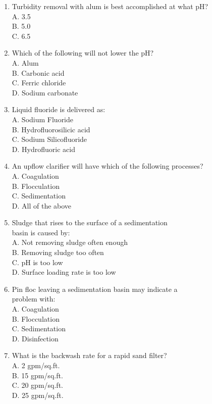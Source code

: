 \begin{enumerate}
\item Turbidity removal with alum is best accomplished at what pH?\\
A. 3.5\\
B. 5.0\\
C. 6.5\\

\item Which of the following will not lower the pH?\\
A. Alum\\
B. Carbonic acid\\
C. Ferric chloride\\
D. Sodium carbonate\\

\item  Liquid fluoride is delivered as:\\
A. Sodium Fluoride\\
B. Hydrofluorosilicic acid\\
C. Sodium Silicofluoride\\
D. Hydrofluoric acid\\


\item An upflow clarifier will have which of the following processes?\\
A. Coagulation\\
B. Flocculation\\
C. Sedimentation\\
D. All of the above\\

\item Sludge that rises to the surface of a sedimentation\\
basin is caused by:\\
A. Not removing sludge often enough\\
B. Removing sludge too often\\
C. pH is too low\\
D. Surface loading rate is too low\\

\item Pin floc leaving a sedimentation basin may indicate a\\
problem with:\\
A. Coagulation\\
B. Flocculation\\
C. Sedimentation\\
D. Disinfection\\


\item What is the backwash rate for a rapid sand filter?\\
A. 2 gpm/sq.ft.\\
B. 15 gpm/sq.ft.\\
C. 20 gpm/sq.ft.\\
D. 25 gpm/sq.ft.\\


\end{enumerate}
